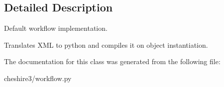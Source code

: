 \subsection{Detailed Description}
\begin{DoxyVerb}Default workflow implementation.

Translates XML to python and compiles it on object instantiation.
\end{DoxyVerb}
 

The documentation for this class was generated from the following file\-:\begin{DoxyCompactItemize}
\item 
cheshire3/workflow.\-py\end{DoxyCompactItemize}
